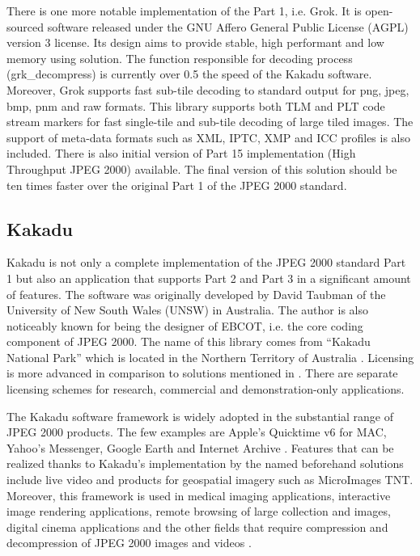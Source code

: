 There is one more notable implementation of the Part 1, i.e. Grok. It is open-sourced software released under
the GNU Affero General Public License (AGPL) version 3 license. Its design aims to provide stable, high
performant and low memory using solution. The function responsible for decoding process (grk\_decompress)
is currently over 0.5 the speed of the Kakadu software. Moreover, Grok supports fast sub-tile decoding
to standard output for png, jpeg, bmp, pnm and raw formats. This library supports both TLM and PLT code stream markers
for fast single-tile and sub-tile decoding of large tiled images. The support of meta-data formats such as
XML, IPTC, XMP and ICC profiles is also included. There is also initial version of Part 15 implementation
(High Throughput JPEG 2000) available. The final version of this solution should be ten times faster over
the original Part 1 of the JPEG 2000 standard.

\subsection{Kakadu} \label{sec:kakadu}

Kakadu is not only a complete implementation of the JPEG 2000 standard Part 1 but also an application
that supports Part 2 and Part 3 in a significant amount of features. The software was originally developed
by David Taubman of the University of New South Wales (UNSW) in Australia. The author is also noticeably
known for being the designer of EBCOT, i.e. the core coding component of JPEG 2000. The name of this library
comes from ``Kakadu National Park'' which is located in the Northern Territory of Australia \cite{jpeg_suite}. Licensing
is more advanced in comparison to solutions mentioned in . There are separate licensing
schemes for research, commercial and demonstration-only applications.

The Kakadu software framework is widely adopted in the substantial range of JPEG 2000 products. The few examples
are Apple's Quicktime v6 for MAC, Yahoo's Messenger, Google Earth and Internet Archive \cite{jpeg_suite}. 
Features that can be realized thanks to Kakadu's implementation by the named beforehand solutions include live video
and products for geospatial imagery such as MicroImages TNT. Moreover, this framework is used in medical imaging applications,
interactive image rendering applications, remote browsing of large collection and images, digital cinema applications
and the other fields that require compression and decompression of JPEG 2000 images and videos \cite{jpeg_suite}.

